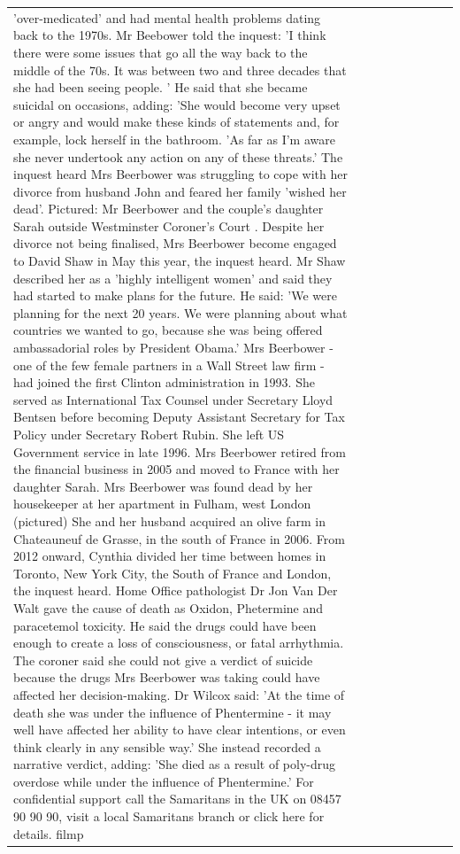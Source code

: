 \begin{table}[H]
\begin{tabular}{lllrlllll}
'over-medicated' and had mental health problems dating back to the 1970s. Mr Beebower told the inquest: 'I think there were some issues that go all the way back to the middle of the 70s. It was between two and three decades that she had been seeing people. ' He said that she became suicidal on occasions, adding: 'She would become very upset or angry and would make these kinds of statements and, for example, lock herself in the bathroom. 'As far as I'm aware she never undertook any action on any of these threats.' The inquest heard Mrs Beerbower was struggling to cope with her divorce from husband John and feared her family 'wished her dead'. Pictured: Mr Beerbower and the couple's daughter Sarah outside Westminster Coroner's Court . Despite her divorce not being finalised, Mrs Beerbower become engaged to David Shaw in May this year, the inquest heard. Mr Shaw described her as a 'highly intelligent women' and said they had started to make plans for the future. He said: 'We were planning for the next 20 years. We were planning about what countries we wanted to go, because she was being offered ambassadorial roles by President Obama.' Mrs Beerbower - one of the few female partners in a Wall Street law firm - had joined the first Clinton administration in 1993. She served as International Tax Counsel under Secretary Lloyd Bentsen before becoming Deputy Assistant Secretary for Tax Policy under Secretary Robert Rubin. She left US Government service in late 1996. Mrs Beerbower retired from the financial business in 2005 and moved to France with her daughter Sarah. Mrs Beerbower was found dead by her housekeeper at her apartment in Fulham, west London (pictured) She and her husband acquired an olive farm in Chateauneuf de Grasse, in the south of France in 2006. From 2012 onward, Cynthia divided her time between homes in Toronto, New York City, the South of France and London, the inquest heard. Home Office pathologist Dr Jon Van Der Walt gave the cause of death as Oxidon, Phetermine and paracetemol toxicity. He said the drugs could have been enough to create a loss of consciousness, or fatal arrhythmia. The coroner said she could not give a verdict of suicide because the drugs Mrs Beerbower was taking could have affected her decision-making. Dr Wilcox said: 'At the time of death she was under the influence of Phentermine - it may well have affected her ability to have clear intentions, or even think clearly in any sensible way.' She instead recorded a narrative verdict, adding: 'She died as a result of poly-drug overdose while under the influence of Phentermine.' For confidential support call the Samaritans in the UK on 08457 90 90 90, visit a local Samaritans branch or click here for details. filmp \\

\end{tabular}
\end{table}
